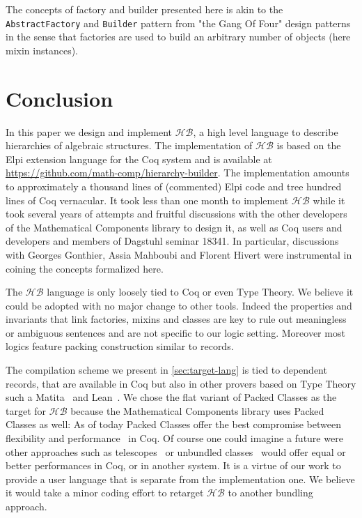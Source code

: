 \documentclass[a4paper,UKenglish,cleveref, autoref]{lipics-v2019}
\newcommand{\HB}{\ensuremath{\mathcal{HB}}}
\newcommand{\mixin}{mixin}
\newcommand{\mixins}{mixins}
\newcommand{\factory}{factory}
\newcommand{\factories}{factories}
\newcommand{\builder}{builder}
\newcommand{\classes}{classes}
\theoremstyle{implem}
\theoremstyle{implem}
\theoremstyle{command}
\begin{document}
{{The concepts of \factory{} and \builder{} presented here is akin to the
\verb-AbstractFactory- and \verb-Builder- pattern from "the Gang Of Four" design
patterns~\cite{gamma1995design} in the sense that \factories{} are used
to build an arbitrary number of objects (here \mixin{} instances).

\section{Conclusion}
In this paper we design and implement \HB{}, a high level language to describe
hierarchies of algebraic structures. The implementation of \HB{} is
based on the Elpi extension language for the Coq system and is available
at \url{https://github.com/math-comp/hierarchy-builder}.
The implementation amounts to approximately a thousand lines of (commented)
Elpi code and tree hundred lines of Coq vernacular. It took less than one month
to implement \HB{} while it took several years of attempts and fruitful
discussions with the other developers of the Mathematical Components library
to design it, as well as Coq users and developers and members of Dagstuhl seminar 18341.
In particular, discussions with Georges Gonthier, Assia Mahboubi and
Florent Hivert were instrumental in coining the concepts formalized here.

The \HB{} language is only loosely tied to Coq or even Type Theory.
We believe it could be adopted with no major change to other tools. Indeed the
properties and invariants that link \factories{}, \mixins{} and \classes{}
are key to rule out meaningless or ambiguous sentences and are not
specific to our logic setting. Moreover
most logics feature packing construction similar to records.

The compilation scheme we present in \autoref{sec:target-lang} is tied to dependent records,
that are available in Coq but also
in other provers based on Type Theory such a Matita~\cite{DBLP:conf/cade/AspertiRCT11}
and Lean~\cite{DBLP:conf/cade/MouraKADR15}.
We chose the flat variant of Packed Classes as the target for \HB{} because the
Mathematical Components library uses Packed Classes as well: As of today
Packed Classes offer the best compromise between flexibility and
performance~\cite[Section 8]{DBLP:conf/itp/MahboubiT13} in Coq.
Of course one could imagine a future were other approaches such as
telescopes~\cite{telescopes} or unbundled
classes~\cite{mathclasses} would offer equal or better performances in Coq, or in
another system.
It is a virtue of our work to provide a user language that is separate
from the implementation one. We believe it would take a minor coding effort to
retarget \HB{} to another bundling approach.

}}
\end{document}
